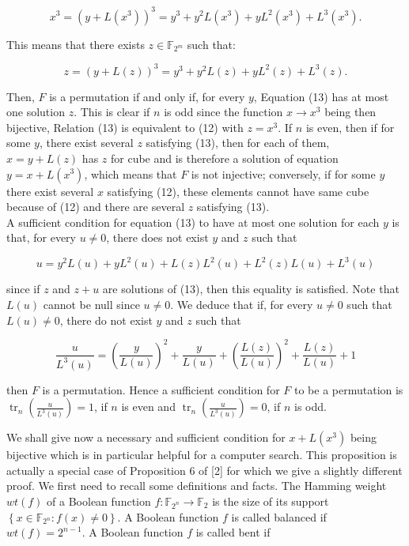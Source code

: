 \documentclass[10pt]{article}
\begin{document}
$$
x^{3}=\left(y+L\left(x^{3}\right)\right)^{3}=y^{3}+y^{2} L\left(x^{3}\right)+y L^{2}\left(x^{3}\right)+L^{3}\left(x^{3}\right) .
$$

This means that there exists $z \in \mathbb{F}_{2^{m}}$ such that:


\begin{equation*}
z=(y+L(z))^{3}=y^{3}+y^{2} L(z)+y L^{2}(z)+L^{3}(z) . \tag{13}
\end{equation*}


Then, $F$ is a permutation if and only if, for every $y$, Equation (13) has at most one solution $z$. This is clear if $n$ is odd since the function $x \rightarrow x^{3}$ being then bijective, Relation (13) is equivalent to (12) with $z=x^{3}$. If $n$ is even, then if for some $y$, there exist several $z$ satisfying (13), then for each of them, $x=y+L(z)$ has $z$ for cube and is therefore a solution of equation $y=x+L\left(x^{3}\right)$, which means that $F$ is not injective; conversely, if for some $y$ there exist several $x$ satisfying (12), these elements cannot have same cube because of (12) and there are several $z$ satisfying (13).\\
A sufficient condition for equation (13) to have at most one solution for each $y$ is that, for every $u \neq 0$, there does not exist $y$ and $z$ such that

$$
u=y^{2} L(u)+y L^{2}(u)+L(z) L^{2}(u)+L^{2}(z) L(u)+L^{3}(u)
$$

since if $z$ and $z+u$ are solutions of (13), then this equality is satisfied. Note that $L(u)$ cannot be null since $u \neq 0$. We deduce that if, for every $u \neq 0$ such that $L(u) \neq 0$, there do not exist $y$ and $z$ such that

$$
\frac{u}{L^{3}(u)}=\left(\frac{y}{L(u)}\right)^{2}+\frac{y}{L(u)}+\left(\frac{L(z)}{L(u)}\right)^{2}+\frac{L(z)}{L(u)}+1
$$

then $F$ is a permutation. Hence a sufficient condition for $F$ to be a permutation is $\operatorname{tr}_{n}\left(\frac{u}{L^{3}(u)}\right)=1$, if $n$ is even and $\operatorname{tr}_{n}\left(\frac{u}{L^{3}(u)}\right)=0$, if $n$ is odd.

We shall give now a necessary and sufficient condition for $x+L\left(x^{3}\right)$ being bijective which is in particular helpful for a computer search. This proposition is actually a special case of Proposition 6 of [2] for which we give a slightly different proof. We first need to recall some definitions and facts. The Hamming weight $w t(f)$ of a Boolean function $f: \mathbb{F}_{2^{n}} \rightarrow \mathbb{F}_{2}$ is the size of its support $\left\{x \in \mathbb{F}_{2^{n}}: f(x) \neq 0\right\}$. A Boolean function $f$ is called balanced if $w t(f)=2^{n-1}$. A Boolean function $f$ is called bent if
\end{document}
